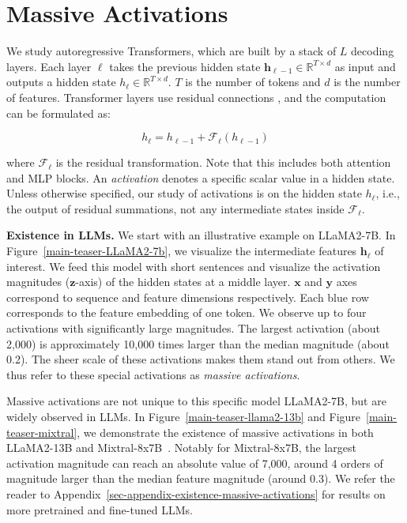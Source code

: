 \section{Massive Activations}\label{section-def}
We study autoregressive Transformers, which are built by a stack of $L$ decoding layers. Each layer $\ell$ takes the previous hidden state $\mathbf{h}_{\ell-1}\in \mathbb{R}^{T\times d}$ as input and outputs a hidden state $h_{\ell}\in \mathbb{R}^{T\times d}$. $T$ is the number of tokens and $d$ is the number of features. Transformer layers use residual connections \citep{he2016resnet}, and the computation can be formulated as:

\begin{equation}
    h_{\ell} = h_{\ell-1} + \mathcal{F}_{\ell}(h_{\ell-1})
\end{equation}

where $\mathbf{\mathcal{F}_{\ell}}$ is the residual transformation. Note that this includes both attention and MLP blocks. An \emph{activation} denotes a specific scalar value in a hidden state. Unless otherwise specified, our study of  activations is  on the hidden state $h_{\ell}$, i.e., the output of residual summations, not any intermediate states inside $\mathbf{\mathcal{F}_{\ell}}$.  

\textbf{Existence in LLMs.} We start with an illustrative example on LLaMA2-7B. In Figure~\ref{main-teaser-LLaMA2-7b}, we visualize the intermediate features $\mathbf{h}_{\ell}$ of interest. We feed this model with short sentences and visualize the activation magnitudes ($\mathbf{z}$-axis) of the hidden states at a middle layer. $\mathbf{x}$ and $\mathbf{y}$ axes correspond to sequence and feature dimensions respectively. Each blue row corresponds to the feature embedding of one token. We observe up to four activations with significantly large magnitudes. The largest activation (about 2,000) is approximately 10,000 times larger than the median magnitude (about 0.2). The sheer scale of these activations makes them stand out from others. We thus refer to these special activations as \textit{massive activations}.

Massive activations are not unique to this specific model LLaMA2-7B, but are widely observed in LLMs. In Figure~\ref{main-teaser-llama2-13b} and Figure~\ref{main-teaser-mixtral}, we demonstrate the existence of massive activations in both LLaMA2-13B and Mixtral-8x7B~\citep{mistral-moe}. Notably for Mixtral-8x7B, the largest activation magnitude can reach an absolute value of 7,000, around 4 orders of magnitude larger than the median feature magnitude (around 0.3). We refer the reader to Appendix~\ref{sec-appendix-existence-massive-activations} for results on more pretrained and fine-tuned LLMs.

